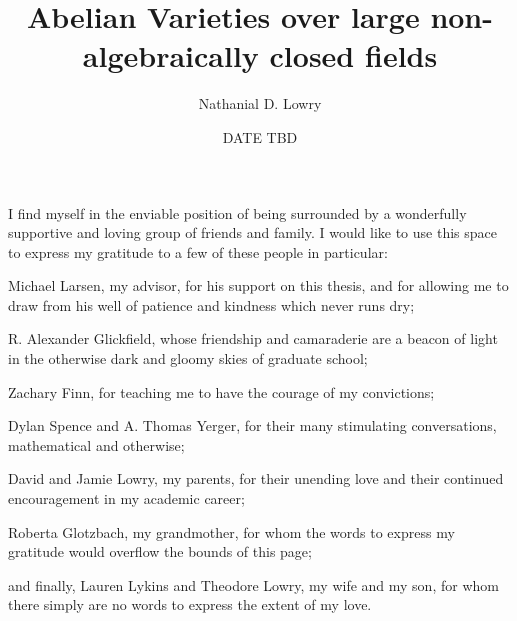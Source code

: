 \documentclass[showabstract,showacknowledgments,showpreface,showdedication,12pt]{iuphd}
\title{Abelian Varieties over large non-algebraically closed fields}
\author{Nathanial D. Lowry}
\date{DATE TBD} %
\begin{document}
\maketitle
\acceptancepage





\begin{acknowledgements}
I find myself in the enviable position of being surrounded by a wonderfully supportive and loving group of friends and family. I would like to use this space to express my gratitude to a few of these people in particular:

Michael Larsen, my advisor, for his support on this thesis, and for allowing me to draw from his well of patience and kindness which never runs dry;

R. Alexander Glickfield, whose friendship and camaraderie are a beacon of light in the otherwise dark and gloomy skies of graduate school;

Zachary Finn, for teaching me to have the courage of my convictions;

Dylan Spence and A. Thomas Yerger, for their many stimulating conversations, mathematical and otherwise;

David and Jamie Lowry, my parents, for their unending love and their continued encouragement in my academic career;

Roberta Glotzbach, my grandmother, for whom the words to express my gratitude would overflow the bounds of this page;

and finally, Lauren Lykins and Theodore Lowry, my wife and my son, for whom there simply are no words to express the extent of my love.
\end{acknowledgements}




\end{document}
